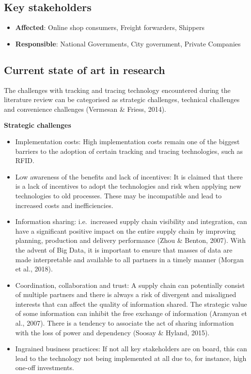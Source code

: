 \documentclass[
]{book}
\providecommand{\tightlist}{%
  \setlength{\itemsep}{0pt}\setlength{\parskip}{0pt}}
\begin{document}
\hypertarget{key-stakeholders-28}{%
\subsection*{Key stakeholders}\label{key-stakeholders-28}}

\begin{itemize}
\tightlist
\item
  \textbf{Affected}: Online shop consumers, Freight forwarders, Shippers
\item
  \textbf{Responsible}: National Governments, City government, Private Companies
\end{itemize}

\hypertarget{current-state-of-art-in-research-28}{%
\subsection*{Current state of art in research}\label{current-state-of-art-in-research-28}}

The challenges with tracking and tracing technology encountered during the literature review can be categorised as strategic challenges, technical challenges and convenience challenges (Vermesan \& Friess, 2014).

\textbf{Strategic challenges}

\begin{itemize}
\tightlist
\item
  Implementation costs: High implementation costs remain one of the biggest barriers to the adoption of certain tracking and tracing technologies, such as RFID.
\item
  Low awareness of the benefits and lack of incentives: It is claimed that there is a lack of incentives to adopt the technologies and risk when applying new technologies to old processes. These may be incompatible and lead to increased costs and inefficiencies.
\item
  Information sharing: i.e.~increased supply chain visibility and integration, can have a significant positive impact on the entire supply chain by improving planning, production and delivery performance (Zhou \& Benton, 2007). With the advent of Big Data, it is important to ensure that masses of data are made interpretable and available to all partners in a timely manner (Morgan et al., 2018).
\item
  Coordination, collaboration and trust: A supply chain can potentially consist of multiple partners and there is always a risk of divergent and misaligned interests that can affect the quality of information shared. The strategic value of some information can inhibit the free exchange of information (Aramyan et al., 2007). There is a tendency to associate the act of sharing information with the loss of power and dependency (Soosay \& Hyland, 2015).
\item
  Ingrained business practices: If not all key stakeholders are on board, this can lead to the technology not being implemented at all due to, for instance, high one-off investments.
\end{itemize}
\end{document}
